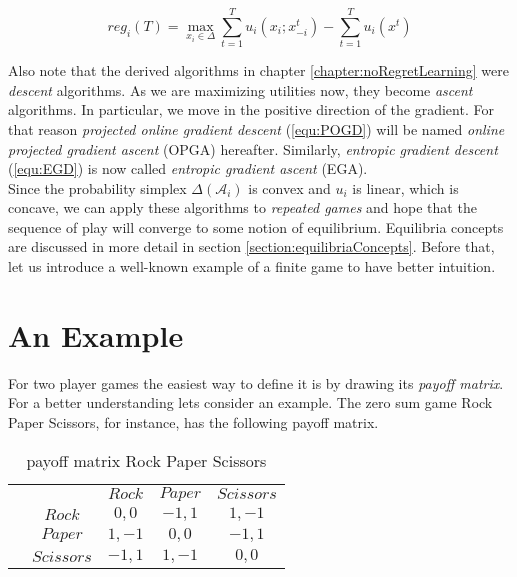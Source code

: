 \begin{equation*}
    reg_{i}(T) = \max_{x_i \in \Delta}\sum_{t=1}^{T} u_i(x_i;x_{-i}^{t}) - \sum_{t=1}^{T}u_i(x^t)
\end{equation*}

Also note that the derived algorithms in chapter \ref{chapter:noRegretLearning} were \textit{descent} algorithms. As we are maximizing utilities now, they become \textit{ascent} algorithms. In particular, we move in the positive direction of the gradient. For that reason \textit{projected online gradient descent} (\ref{equ:POGD}) will be named \textit{online projected gradient ascent} (OPGA) hereafter. Similarly, \textit{entropic gradient descent} (\ref{equ:EGD}) is now called \textit{entropic gradient ascent} (EGA). \\

Since the probability simplex $\Delta(\mathcal{A}_i)$ is convex and $u_i$ is linear, which is concave, we can apply these algorithms to \textit{repeated games} and hope that the sequence of play will converge to some notion of equilibrium. Equilibria concepts are discussed in more detail in section \ref{section:equilibriaConcepts}. Before that, let us introduce a well-known example of a finite game to have better intuition.


\section{An Example}\label{section:anExample}

For two player games the easiest way to define it is by drawing its \textit{payoff matrix}. For a better understanding lets consider an example. The zero sum game Rock Paper Scissors, for instance, has the following payoff matrix.\\

\begin{table}[H]\centering
\setlength{\extrarowheight}{2pt}
\begin{tabular}{cc|c|c|c|}
  & \multicolumn{1}{c}{} & \multicolumn{1}{c}{$Rock$}  & \multicolumn{1}{c}{$Paper$}  & \multicolumn{1}{c}{$Scissors$} \\\cline{3-5}
            & $Rock$ & $0,0$ & $-1,1$ & $1,-1$ \\ \cline{3-5}
            & $Paper$ & $1,-1$ & $0,0$ & $-1,1$ \\\cline{3-5}
            & $Scissors$ & $-1,1$ & $1,-1$ & $0,0$ \\\cline{3-5}
\end{tabular}\caption{\label{tab:payoffRPSFromDefinition}payoff matrix Rock Paper Scissors}
\end{table}

